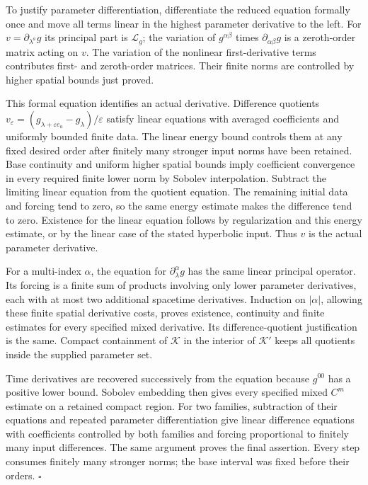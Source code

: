 \documentclass[
  english,
  11pt,
  reqno]{amsart}
\begin{document}
To justify parameter differentiation, differentiate the reduced equation
formally once and move all terms linear in the highest parameter
derivative to the left. For \(v=\partial_{\lambda^a}g\) its principal
part is \(\mathcal L_g\); the variation of \(g^{\alpha\beta}\) times
\(\partial_{\alpha\beta}g\) is a zeroth-order matrix acting on \(v\).
The variation of the nonlinear first-derivative terms contributes first-
and zeroth-order matrices. Their finite norms are controlled by higher
spatial bounds just proved.

This formal equation identifies an actual derivative. Difference
quotients
\(v_\varepsilon=(g_{\lambda+\varepsilon e_a}-g_\lambda)/\varepsilon\)
satisfy linear equations with averaged coefficients and uniformly
bounded finite data. The linear energy bound controls them at any fixed
desired order after finitely many stronger input norms have been
retained. Base continuity and uniform higher spatial bounds imply
coefficient convergence in every required finite lower norm by Sobolev
interpolation. Subtract the limiting linear equation from the quotient
equation. The remaining initial data and forcing tend to zero, so the
same energy estimate makes the difference tend to zero. Existence for
the linear equation follows by regularization and this energy estimate,
or by the linear case of the stated hyperbolic input. Thus \(v\) is the
actual parameter derivative.

For a multi-index \(\alpha\), the equation for
\(\partial_\lambda^\alpha g\) has the same linear principal operator.
Its forcing is a finite sum of products involving only lower parameter
derivatives, each with at most two additional spacetime derivatives.
Induction on \(|\alpha|\), allowing these finite spatial derivative
costs, proves existence, continuity and finite estimates for every
specified mixed derivative. Its difference-quotient justification is the
same. Compact containment of \(\mathcal K\) in the interior of
\(\mathcal K'\) keeps all quotients inside the supplied parameter set.

Time derivatives are recovered successively from the equation because
\(g^{00}\) has a positive lower bound. Sobolev embedding then gives
every specified mixed \(C^m\) estimate on a retained compact region. For
two families, subtraction of their equations and repeated parameter
differentiation give linear difference equations with coefficients
controlled by both families and forcing proportional to finitely many
input differences. The same argument proves the final assertion. Every
step consumes finitely many stronger norms; the base interval was fixed
before their orders. \hfill\(\square\)
\end{document}
